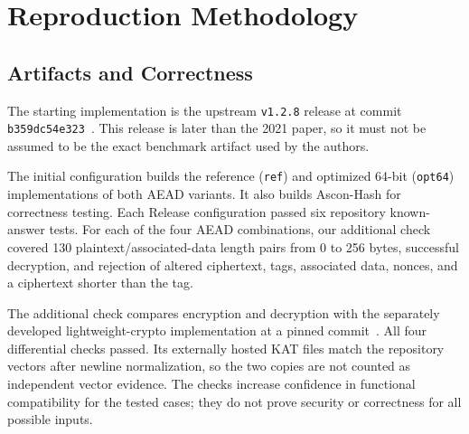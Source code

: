\documentclass[conference]{IEEEtran}
\begin{document}
\section{Reproduction Methodology}
\subsection{Artifacts and Correctness}
The starting implementation is the upstream \texttt{v1.2.8} release at commit
\texttt{b359dc54e323}~\cite{asconrepo}.
This release is later than the 2021 paper, so it must not be assumed to be the
exact benchmark artifact used by the authors.

The initial configuration builds the reference (\texttt{ref}) and optimized
64-bit (\texttt{opt64}) implementations of both AEAD variants. It also builds
Ascon-Hash for correctness testing. Each Release configuration passed six
repository known-answer tests. For each of the four AEAD combinations, our
additional check covered 130 plaintext/associated-data length pairs from 0 to
256 bytes, successful decryption, and rejection of altered ciphertext, tags,
associated data, nonces, and a ciphertext shorter than the tag.

The additional check compares encryption and decryption with the separately
developed lightweight-crypto implementation at a pinned commit~\cite{lightweightcrypto}.
All four differential checks passed. Its externally hosted KAT files match the
repository vectors after newline normalization, so the two copies are not
counted as independent vector evidence. The checks increase confidence in
functional compatibility for the tested cases; they do not prove security or
correctness for all possible inputs.
\end{document}
